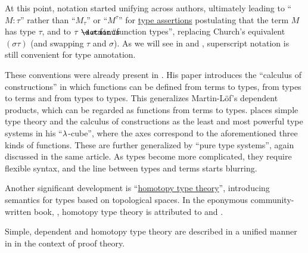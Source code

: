 \begin{remark}
  At this point, notation started unifying across authors, ultimately leading to \enquote{\( M: \tau \)} rather than \enquote{\( M_\tau \)} or \enquote{\( M^\tau \)} for \hyperref[def:type_assertion]{type assertions} postulating that the term \( M \) has type \( \tau \), and to \( \tau \synimplies \sigma \) for \enquote{function types}, replacing Church's equivalent \( (\sigma\tau) \) (and swapping \( \tau \) and \( \sigma \)). As we will see in  and , superscript notation is still convenient for type annotation.

  These conventions were already present in . His paper introduces the \enquote{calculus of constructions} in which functions can be defined from terms to types, from types to terms and from types to types. This generalizes Martin-L\"of's dependent products, which can be regarded as functions from terms to types.  places simple type theory and the calculus of constructions as the least and most powerful type systems in his \enquote{\( \mathrm{\lambda} \)-cube}, where the axes correspond to the aforementioned three kinds of functions. These are further generalized by \enquote{pure type systems}, again discussed in the same article. As types become more complicated, they require flexible syntax, and the line between types and terms starts blurring.

  Another significant development is \enquote{\hyperref[con:homotopy_type_theory]{homotopy type theory}}, introducing semantics for types based on topological spaces. In the eponymous community-written book, \cite{UnivalentProject2024OctoberHoTT}, homotopy type theory is attributed to \cite{Voevodski2006HoTT} and \cite{AwodeyWarren2009HoTT}.

  Simple, dependent and homotopy type theory are described in a unified manner in \cite{Mimram2020ProgramEqualsProof} in the context of proof theory.
\end{remark}

